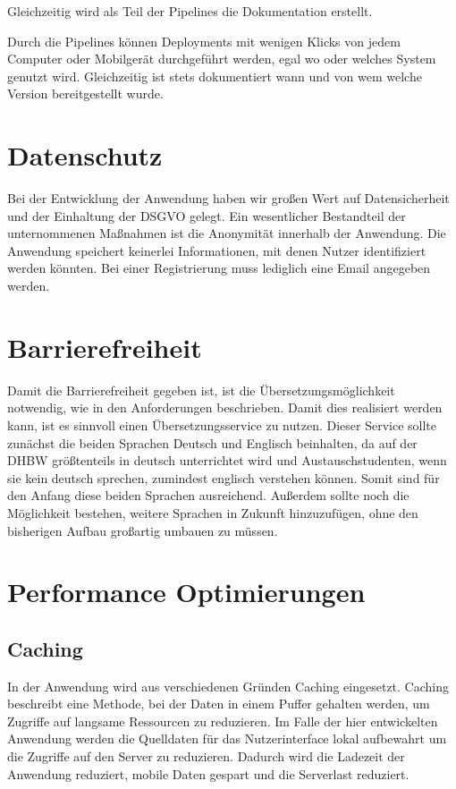 Gleichzeitig wird als Teil der Pipelines die Dokumentation erstellt.

Durch die Pipelines können Deployments mit wenigen Klicks von jedem Computer oder Mobilgerät durchgeführt werden, egal wo oder welches System genutzt wird.
Gleichzeitig ist stets dokumentiert wann und von wem welche Version bereitgestellt wurde.


\section{Datenschutz}
Bei der Entwicklung der Anwendung haben wir großen Wert auf Datensicherheit und der Einhaltung der DSGVO gelegt.
Ein wesentlicher Bestandteil der unternommenen Maßnahmen ist die Anonymität innerhalb der Anwendung.
Die Anwendung speichert keinerlei Informationen, mit denen Nutzer identifiziert werden könnten.
Bei einer Registrierung muss lediglich eine Email angegeben werden.


\section{Barrierefreiheit}

Damit die Barrierefreiheit gegeben ist, ist die Übersetzungsmöglichkeit notwendig, wie in den Anforderungen beschrieben. Damit dies 
realisiert werden kann, ist es sinnvoll einen Übersetzungsservice zu nutzen. Dieser Service sollte zunächst die beiden Sprachen Deutsch und 
Englisch beinhalten, da auf der DHBW größtenteils in deutsch unterrichtet wird und Austauschstudenten, wenn sie kein deutsch sprechen, zumindest englisch 
verstehen können. Somit sind für den Anfang diese beiden Sprachen ausreichend. Außerdem sollte noch die Möglichkeit bestehen, weitere Sprachen 
in Zukunft hinzuzufügen, ohne den bisherigen Aufbau großartig umbauen zu müssen. 


\section{Performance Optimierungen}
\subsection{Caching}
In der Anwendung wird aus verschiedenen Gründen Caching eingesetzt.
Caching beschreibt eine Methode, bei der Daten in einem Puffer gehalten werden, um Zugriffe auf langsame Ressourcen zu reduzieren.
Im Falle der hier entwickelten Anwendung werden die Quelldaten für das Nutzerinterface lokal aufbewahrt um die Zugriffe auf den Server zu reduzieren.
Dadurch wird die Ladezeit der Anwendung reduziert, mobile Daten gespart und die Serverlast reduziert.


